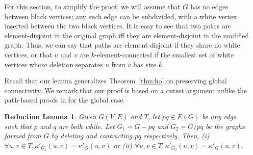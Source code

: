 \documentclass[11pt]{article}
\newtheorem*{redlem}{Reduction Lemma}
\def\wc{\kappa'}
\begin{document}
For this section, to simplify the proof, we will assume that $G$ has
no edges between black vertices; any such edge can be subdivided, with
a white vertex inserted between the two black vertices. It is easy to
see that two paths are element-disjoint in the original graph iff they
are element-disjoint in the modified graph. Thus, we can say that
paths are element disjoint if they share no white vertices, or that
$u$ and $v$ are $k$-element-connected if the smallest set of white
vertices whose deletion separates $u$ from $v$ has size $k$.

Recall that our lemma generalizes Theorem~\ref{thm:ho} on preserving
global connectivity. We remark that our proof is based on a cutset
argument unlike the path-based proofs in \cite{hind,cs} for the global
case.

\begin{redlem}
  Given $G(V,E)$ and $T$, let $pq \in E(G)$ be any edge such that $p$
  and $q$ are both white. Let $G_1 = G - pq$ and $G_2 = G / pq$ be the
  graphs formed from $G$ by deleting and contracting $pq$
  respectively. Then, 
  (i) $\forall u,v \in T, \wc_{G_1}(u,v) = \wc_G(u,v)$ or 
  (ii) $\forall u,v \in T, \wc_{G_2}(u,v) = \wc_G(u,v)$.
\end{redlem}
\vspace{0.1in}
\end{document}
